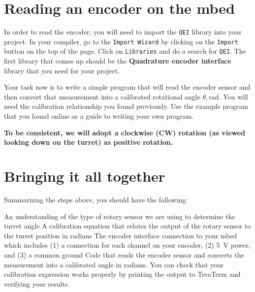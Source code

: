 \documentclass{exam}
\begin{document}
\section{Reading an encoder on the mbed}
In order to read the encoder, you will need to import the \lstinline{QEI} library into your project. In your compiler, go to the \lstinline{Import Wizard} by clicking on the \lstinline{Import} button on the top of the page.  Click on \lstinline{Libraries} and do a search for \lstinline{QEI}.  The first library that comes up should be the \textbf{Quadrature encoder interface} library that you need for your project.  

Your task now is to write a simple program that will read the encoder sensor and then convert that measurement into a calibrated rotational angle $\theta, \si{\radian}$. You will need the calibration relationship you found previously.  Use the example program that you found online as a guide to writing your own program.

\textbf{To be consistent, we will adopt a clockwise (CW) rotation (as viewed looking down on the turret) as positive rotation.} 




\section{Bringing it all together}
Summarizing the steps above, you should have the following:
\begin{questions}
\question An understanding of the type of rotary sensor we are using to determine the turret angle
\question A calibration equation that relates the output of the rotary sensor to the turret position in radians
\question The encoder interface connection to your mbed which includes (1) a connection for each channel on your encoder, (2) \SI{5}{\volt} power, and (3) a common ground
\question Code that reads the encoder sensor and converts the measurement into a calibrated angle in radians. You can check that your calibration expression works properly by printing the output to TeraTerm and verifying your results.
\end{questions}
\end{document}

